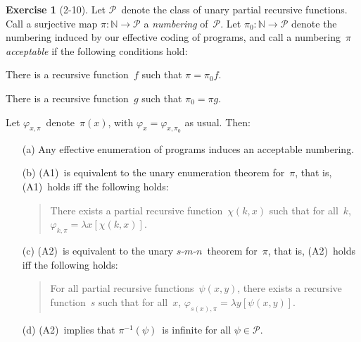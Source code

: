 \documentclass[letterpaper]{article}
\newcommand{\N}{\mathbb{N}}
\renewcommand{\P}{\mathcal{P}}
\newcommand{\smn}{$s$-$m$-$n$}
\theoremstyle{definition}
\newtheorem*{exer}{Exercise}
\theoremstyle{remark}
\theoremstyle{direction}
\begin{document}
\begin{exer}[2-10]
Let $\P$~denote the class of unary partial recursive functions. Call a surjective map $\pi:\N\to\P$ a \emph{numbering} of~$\P$. Let $\pi_0:\N\to\P$ denote the numbering induced by our effective coding of programs, and call a numbering~$\pi$ \emph{acceptable} if the following conditions hold:
\begin{description}[itemsep=0pt]
\item[(A1)] There is a recursive function~$f$ such that $\pi=\pi_0f$.
\item[(A2)] There is a recursive function~$g$ such that $\pi_0=\pi g$.
\end{description}
Let $\varphi_{x,\pi}$~denote~$\pi(x)$, with $\varphi_x=\varphi_{x,\pi_0}$ as usual. Then:
\begin{enumerate}[itemsep=0pt]
\item[(a)] Any effective enumeration of programs induces an acceptable numbering.
\item[(b)] (A1)~is equivalent to the unary enumeration theorem for~$\pi$, that is, (A1)~holds iff the following holds:
\begin{quote}
There exists a partial recursive function~$\chi(k,x)$ such that for all~$k$, $\varphi_{k,\pi}=\lambda x[\chi(k,x)]$.
\end{quote}
\item[(c)] (A2)~is equivalent to the unary \smn\ theorem for~$\pi$, that is, (A2)~holds iff the following holds:
\begin{quote}
For all partial recursive functions~$\psi(x,y)$, there exists a recursive function~$s$ such that for all~$x$, $\varphi_{s(x),\pi}=\lambda y[\psi(x,y)]$.
\end{quote}
\item[(d)] (A2)~implies that $\pi^{-1}(\psi)$~is infinite for all $\psi\in\P$.
\end{enumerate}
\end{exer}
\end{document}
